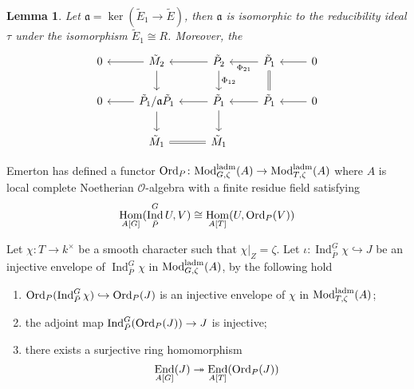 \documentclass[leqno]{amsart}
\newcommand{\laMod}{\textnormal{Mod}^{\textnormal{ladm}}}
\newcommand{\Ord}{\textnormal{Ord}}
\newcommand{\oo}{\mathcal O}
\newcommand{\1}{\mathbf{1}}
\newcommand{\fa}{\mathfrak a}
\DeclareMathOperator{\End}{End}
\DeclareMathOperator{\Hom}{Hom}
\DeclareMathOperator{\Ind}{Ind}
\newtheorem{lem}[thm]{Lemma}
\theoremstyle{definition}
\theoremstyle{remark}
\begin{document}
\begin{lem}
	Let $\fa=\ker(\tilde{E}_1\to \tilde{E})$,
	then $\fa$ is isomorphic to the reducibility ideal  $\tau$
	under the isomorphism  $ \tilde{E}_1\cong R$.
	Moreover, the 
\[
	\begin{tikzcd}
		0 &
		\tilde{M}_2 \arrow[l] \arrow[d] &
		\tilde{P}_2 \arrow[l] \arrow[d,"\Phi_{12}"] &
		\tilde{P}_1 \arrow[l,"\Phi_{21}"] \arrow[d,equal] & 0 \arrow[l]\\
		0 &
		\tilde{P}_1/\fa\tilde{P}_1 \arrow[l] \arrow[d] &
		\tilde{P}_1 \arrow[l] \arrow[d] &
		\tilde{P}_1 \arrow[l] & 0 \arrow[l]\\
				      & \tilde{M}_1 
				      & \tilde{M}_1 \arrow[l,equal] & & 
	\end{tikzcd}
\]
\end{lem}

Emerton has defined a functor
$\Ord_P\colon \laMod_{G,\zeta}(A)\to \laMod_{T,\zeta}(A)$
where $A$ is local complete Noetherian  $\oo$-algebra
with a finite residue field satisfying 
\[
	\Hom_{A[G]}(\Ind_{\bar{P}}^GU,V)\cong \Hom_{A[T]}(U, \Ord_P(V))
\]

Let $\chi\colon T\to k^\times$ be a smooth character
such that  $\chi|_Z=\zeta$.
Let  $\iota\colon \Ind_{\bar{P}}^G\chi\hookrightarrow J$ 
be an injective envelope of $\Ind_{\bar{P}}^G\chi$
in $\laMod_{G,\zeta}(A)$, 
by \cite[Prop 7.1]{pask} the following hold
\begin{enumerate}[label=(\alph*)]
	\item $\Ord_P(\Ind_{\bar{P}}^G\chi)\hookrightarrow \Ord_P(J)$
		is an injective envelope of $\chi$ in  $\laMod_{T,\zeta}(A)$;
	\item the adjoint map $\Ind_{\bar{P}}^G(\Ord_P(J))\to J$ is injective;
	\item there exists a surjective ring homomorphism
		\[
			\End_{A[G]}(J)\twoheadrightarrow \End_{A[T]}(\Ord_P(J))
		\]
\end{enumerate}







\end{document}
